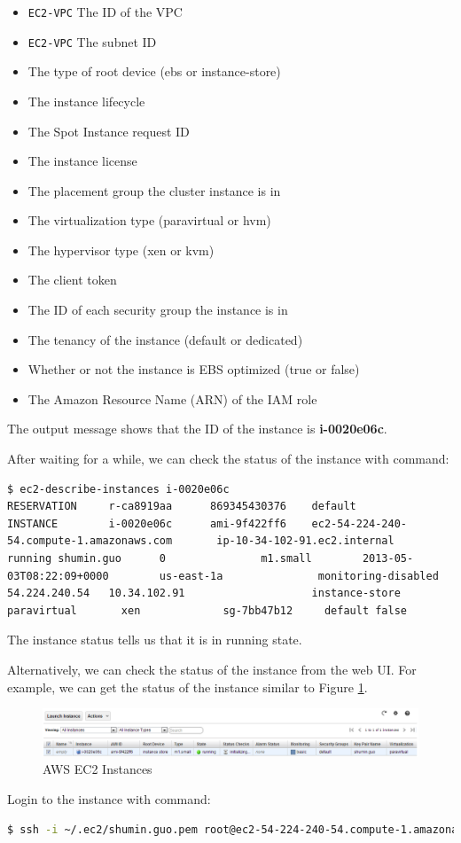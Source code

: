 \begin{itemize}
  \item \verb|EC2-VPC| The ID of the VPC
  \item \verb|EC2-VPC| The subnet ID
  \item The type of root device (ebs or instance-store)
  \item The instance lifecycle
  \item The Spot Instance request ID
  \item The instance license
  \item The placement group the cluster instance is in
  \item The virtualization type (paravirtual or hvm)
  \item The hypervisor type (xen or kvm)
  \item The client token
  \item The ID of each security group the instance is in
  \item The tenancy of the instance (default or dedicated)
  \item Whether or not the instance is EBS optimized (true or false)
  \item The Amazon Resource Name (ARN) of the IAM role
\end{itemize}

The output message shows that the ID of the instance is \textbf{i-0020e06c}.

After waiting for a while, we can check the status of the instance with command:
\lstset{style=bashstyle}
\begin{lstlisting}
$ ec2-describe-instances i-0020e06c
RESERVATION     r-ca8919aa      869345430376    default
INSTANCE        i-0020e06c      ami-9f422ff6    ec2-54-224-240-54.compute-1.amazonaws.com       ip-10-34-102-91.ec2.internal      running shumin.guo      0               m1.small        2013-05-03T08:22:09+0000        us-east-1a               monitoring-disabled      54.224.240.54   10.34.102.91                    instance-store                                  paravirtual       xen             sg-7bb47b12     default false
\end{lstlisting}

The instance status tells us that it is in running state.

Alternatively, we can check the status of the instance from the web UI. For example, we can get the status of the instance similar to Figure \ref{fig:aws.ec2.instances}.
\begin{figure}[ht]
  \centering
  \includegraphics[width=.95\textwidth]{figs/5163os_08_21.png}
  \caption{AWS EC2 Instances}\label{fig:aws.ec2.instances}
\end{figure} 
Login to the instance with command:
\lstset{style=bashstyle}
\begin{lstlisting}[language=bash]
$ ssh -i ~/.ec2/shumin.guo.pem root@ec2-54-224-240-54.compute-1.amazonaws.com
\end{lstlisting}

